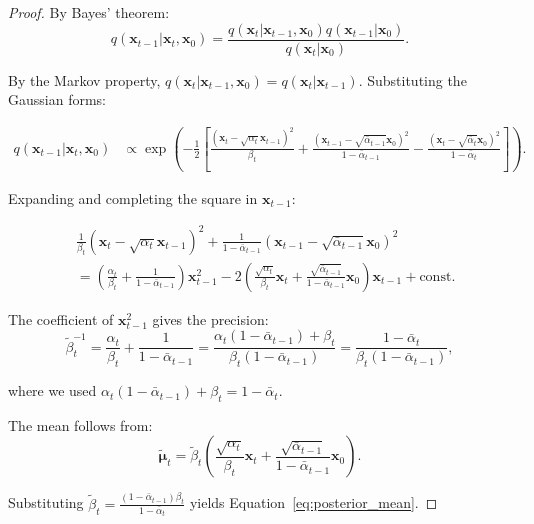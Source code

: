 \documentclass[12pt]{report}
\theoremstyle{definition}
\begin{document}
\begin{proof}
By Bayes' theorem:
\[
q(\mathbf{x}_{t-1} | \mathbf{x}_t, \mathbf{x}_0) = \frac{q(\mathbf{x}_t | \mathbf{x}_{t-1}, \mathbf{x}_0) q(\mathbf{x}_{t-1} | \mathbf{x}_0)}{q(\mathbf{x}_t | \mathbf{x}_0)}.
\]

By the Markov property, $q(\mathbf{x}_t | \mathbf{x}_{t-1}, \mathbf{x}_0) = q(\mathbf{x}_t | \mathbf{x}_{t-1})$. Substituting the Gaussian forms:

\begin{align*}
q(\mathbf{x}_{t-1} | \mathbf{x}_t, \mathbf{x}_0) &\propto \exp\left(-\frac{1}{2}\left[\frac{(\mathbf{x}_t - \sqrt{\alpha_t}\mathbf{x}_{t-1})^2}{\beta_t} + \frac{(\mathbf{x}_{t-1} - \sqrt{\bar{\alpha}_{t-1}}\mathbf{x}_0)^2}{1 - \bar{\alpha}_{t-1}} - \frac{(\mathbf{x}_t - \sqrt{\bar{\alpha}_t}\mathbf{x}_0)^2}{1 - \bar{\alpha}_t}\right]\right).
\end{align*}

Expanding and completing the square in $\mathbf{x}_{t-1}$:

\begin{align*}
&\frac{1}{\beta_t}(\mathbf{x}_t - \sqrt{\alpha_t}\mathbf{x}_{t-1})^2 + \frac{1}{1 - \bar{\alpha}_{t-1}}(\mathbf{x}_{t-1} - \sqrt{\bar{\alpha}_{t-1}}\mathbf{x}_0)^2 \\
&= \left(\frac{\alpha_t}{\beta_t} + \frac{1}{1 - \bar{\alpha}_{t-1}}\right)\mathbf{x}_{t-1}^2 - 2\left(\frac{\sqrt{\alpha_t}}{\beta_t}\mathbf{x}_t + \frac{\sqrt{\bar{\alpha}_{t-1}}}{1 - \bar{\alpha}_{t-1}}\mathbf{x}_0\right)\mathbf{x}_{t-1} + \text{const}.
\end{align*}

The coefficient of $\mathbf{x}_{t-1}^2$ gives the precision:
\[
\tilde{\beta}_t^{-1} = \frac{\alpha_t}{\beta_t} + \frac{1}{1 - \bar{\alpha}_{t-1}} = \frac{\alpha_t(1-\bar{\alpha}_{t-1}) + \beta_t}{\beta_t(1-\bar{\alpha}_{t-1})} = \frac{1 - \bar{\alpha}_t}{\beta_t(1-\bar{\alpha}_{t-1})},
\]

where we used $\alpha_t(1-\bar{\alpha}_{t-1}) + \beta_t = 1 - \bar{\alpha}_t$.

The mean follows from:
\[
\tilde{\boldsymbol{\mu}}_t = \tilde{\beta}_t\left(\frac{\sqrt{\alpha_t}}{\beta_t}\mathbf{x}_t + \frac{\sqrt{\bar{\alpha}_{t-1}}}{1 - \bar{\alpha}_{t-1}}\mathbf{x}_0\right).
\]

Substituting $\tilde{\beta}_t = \frac{(1-\bar{\alpha}_{t-1})\beta_t}{1-\bar{\alpha}_t}$ yields Equation~\eqref{eq:posterior_mean}.
\end{proof}
\end{document}
